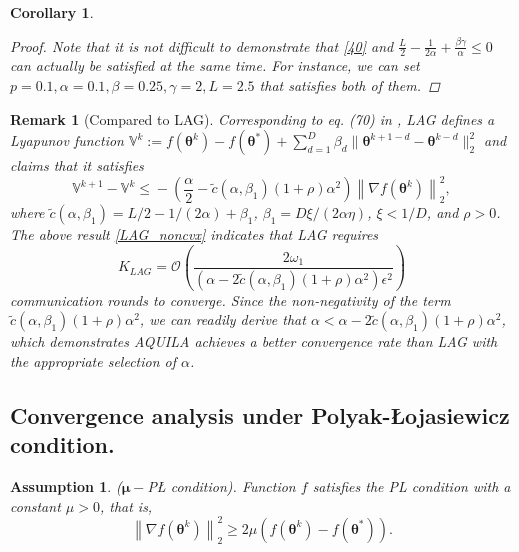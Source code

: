\documentclass[lettersize,journal]{IEEEtran}
\newtheorem{assumption}{Assumption}
\newtheorem{corollary}{Corollary}
\newtheorem*{remark}{Remark}
\begin{document}
\begin{corollary}
\begin{proof}
    Note that it is not difficult to demonstrate that \eqref{40} and $\frac{L}{2}-\frac{1}{2 \alpha}+\frac{\beta\gamma}{\alpha} \leqslant 0$ can actually be satisfied at the same time. For instance, we can set $p = 0.1, \alpha = 0.1, \beta = 0.25, \gamma = 2, L = 2.5$ that satisfies both of them.
\end{proof}
\end{corollary}

\begin{remark}[Compared to LAG]
    Corresponding to eq. (70) in \cite{chen2018lag}, LAG defines a Lyapunov function $\mathbb{V}^k:=f(\boldsymbol{\theta}^k)-f(\boldsymbol{\theta}^*)+\sum_{d=1}^D \beta_d\|\boldsymbol{\theta}^{k+1-d}-\boldsymbol{\theta}^{k-d}\|_2^2$ and claims that it satisfies
\begin{equation}
\mathbb{V}^{k+1}\!-\!\mathbb{V}^k \!\leq\!\!-\!\left(\frac{\alpha}{2}\!-\!\tilde{c}\left(\alpha, \beta_1\right)(1\!+\!\rho)\! \alpha^2\right)\left\|\nabla f(\boldsymbol{\theta}^k)\right\|_2^2,
\label{LAG_noncvx}
\end{equation}
where $\tilde{c}\left(\alpha, \beta_1\right) = L / 2 - 1 / (2\alpha) + \beta_1$, $\beta_1 = D \xi / (2\alpha\eta)$, $\xi < 1 / D$, and $\rho > 0$. The above result \eqref{LAG_noncvx} indicates that LAG requires
\begin{equation}
K_{LAG} = \mathcal{O}\left(\frac{2 \omega_1}{\left(\alpha - 2\tilde{c}\left(\alpha, \beta_1\right)(1+\rho) \alpha^2\right) \epsilon^2}\right)
\end{equation}
communication rounds to converge. Since the non-negativity of the term $\tilde{c}\left(\alpha, \beta_1\right)(1+\rho) \alpha^2$, we can readily derive that $\alpha < \alpha - 2\tilde{c}\left(\alpha, \beta_1\right)(1+\rho) \alpha^2$,
which demonstrates AQUILA achieves a better convergence rate than LAG with the appropriate selection of $\alpha$.
\end{remark}

 
\subsection{Convergence analysis under Polyak-Łojasiewicz condition.} 

\begin{assumption}($\mathbf{\mu-}$PŁ condition). 
\label{assumption4}
\textit{Function $f$ satisfies the PL condition with a constant $\mu > 0$, that is,}
\begin{equation}
    \left\|\nabla f(\boldsymbol{\theta}^k)\right\|_2^2 \geqslant 2 \mu (f(\boldsymbol{\theta}^k) - f(\boldsymbol{\theta}^*)).
    \label{PL_condtion}
\end{equation}
\end{assumption}
\end{document}
